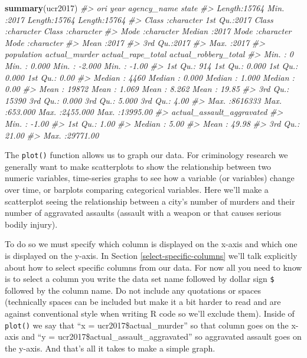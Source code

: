 \documentclass[
  12pt,
]{book}
\newenvironment{Shaded}{\begin{snugshade}}{\end{snugshade}}
\newcommand{\CommentTok}[1]{\textcolor[rgb]{0.56,0.35,0.01}{\textit{#1}}}
\newcommand{\KeywordTok}[1]{\textcolor[rgb]{0.13,0.29,0.53}{\textbf{#1}}}
\newcommand{\NormalTok}[1]{#1}
\begin{document}
\begin{Shaded}
\begin{Highlighting}[]
\KeywordTok{summary}\NormalTok{(ucr2017)}
\CommentTok{\#>      ori                 year      agency\_name           state          }
\CommentTok{\#>  Length:15764       Min.   :2017   Length:15764       Length:15764      }
\CommentTok{\#>  Class :character   1st Qu.:2017   Class :character   Class :character  }
\CommentTok{\#>  Mode  :character   Median :2017   Mode  :character   Mode  :character  }
\CommentTok{\#>                     Mean   :2017                                        }
\CommentTok{\#>                     3rd Qu.:2017                                        }
\CommentTok{\#>                     Max.   :2017                                        }
\CommentTok{\#>    population      actual\_murder     actual\_rape\_total  actual\_robbery\_total}
\CommentTok{\#>  Min.   :      0   Min.   :  0.000   Min.   :  {-}2.000   Min.   :   {-}1.00    }
\CommentTok{\#>  1st Qu.:    914   1st Qu.:  0.000   1st Qu.:   0.000   1st Qu.:    0.00    }
\CommentTok{\#>  Median :   4460   Median :  0.000   Median :   1.000   Median :    0.00    }
\CommentTok{\#>  Mean   :  19872   Mean   :  1.069   Mean   :   8.262   Mean   :   19.85    }
\CommentTok{\#>  3rd Qu.:  15390   3rd Qu.:  0.000   3rd Qu.:   5.000   3rd Qu.:    4.00    }
\CommentTok{\#>  Max.   :8616333   Max.   :653.000   Max.   :2455.000   Max.   :13995.00    }
\CommentTok{\#>  actual\_assault\_aggravated}
\CommentTok{\#>  Min.   :   {-}1.00         }
\CommentTok{\#>  1st Qu.:    1.00         }
\CommentTok{\#>  Median :    5.00         }
\CommentTok{\#>  Mean   :   49.98         }
\CommentTok{\#>  3rd Qu.:   21.00         }
\CommentTok{\#>  Max.   :29771.00}
\end{Highlighting}
\end{Shaded}

The \texttt{plot()} function allows us to graph our data. For criminology research we generally want to make scatterplots to show the relationship between two numeric variables, time-series graphs to see how a variable (or variables) change over time, or barplots comparing categorical variables. Here we'll make a scatterplot seeing the relationship between a city's number of murders and their number of aggravated assaults (assault with a weapon or that causes serious bodily injury).

To do so we must specify which column is displayed on the x-axis and which one is displayed on the y-axis. In Section \ref{select-specific-columns} we'll talk explicitly about how to select specific columns from our data. For now all you need to know is to select a column you write the data set name followed by dollar sign \texttt{\$} followed by the column name. Do not include any quotations or spaces (technically spaces can be included but make it a bit harder to read and are against conventional style when writing R code so we'll exclude them). Inside of \texttt{plot()} we say that ``x = ucr2017\$actual\_murder'' so that column goes on the x-axis and ``y = ucr2017\$actual\_assault\_aggravated'' so aggravated assault goes on the y-axis. And that's all it takes to make a simple graph.
\end{document}
